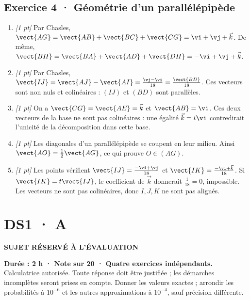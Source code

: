 \subsection*{Exercice 4 · Géométrie d'un parallélépipède}\begin{enumerate}

\item \textit{[1 pt]} Par Chasles, $\vect{AG}=\vect{AB}+\vect{BC}+\vect{CG}=\vi +\vj +\vec k$. De même, $\vect{BH}=\vect{BA}+\vect{AD}+\vect{DH}=-\vi +\vj +\vec k$.

\item \textit{[1 pt]} Par Chasles, $\vect{IJ}=\vect{AJ}-\vect{AI}=\frac{\vj -\vi }{18}=\frac{\vect{BD}}{18}$. Ces vecteurs sont non nuls et colinéaires : $(IJ)$ et $(BD)$ sont parallèles.

\item \textit{[1 pt]} On a $\vect{CG}=\vect{AE}=\vec k$ et $\vect{AB}=\vi $. Ces deux vecteurs de la base ne sont pas colinéaires : une égalité $\vec k=t\vi $ contredirait l'unicité de la décomposition dans cette base.

\item \textit{[1 pt]} Les diagonales d'un parallélépipède se coupent en leur milieu. Ainsi $\vect{AO}=\frac12\vect{AG}$, ce qui prouve $O\in(AG)$.

\item \textit{[1 pt]} Les points vérifient $\vect{IJ}=\frac{-\vi +\vj }{18}$ et $\vect{IK}=\frac{-\vi +\vec k}{18}$. Si $\vect{IK}=t\vect{IJ}$, le coefficient de $\vec k$ donnerait $\frac{1}{18}=0$, impossible. Les vecteurs ne sont pas colinéaires, donc $I,J,K$ ne sont pas alignés.

\end{enumerate}

\fi

\ifprof

\clearpage{}\label{sujet:1-3}

\section*{DS1 · A}

{\sffamily\bfseries\color{amber}SUJET RÉSERVÉ À L'ÉVALUATION\par}

\textbf{Durée : 2 h · Note sur 20 · Quatre exercices indépendants.}\\Calculatrice autorisée. Toute réponse doit être justifiée ; les démarches incomplètes seront prises en compte. Donner les valeurs exactes ; arrondir les probabilités à $10^{-6}$ et les autres approximations à $10^{-4}$, sauf précision différente.

